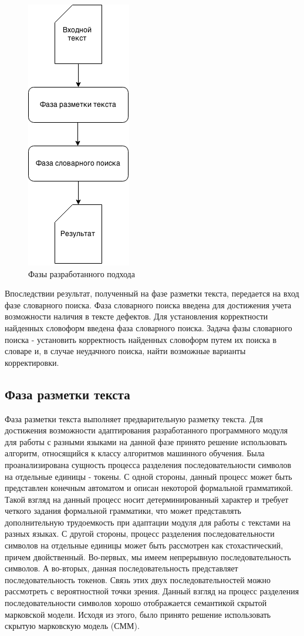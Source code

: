 \begin{figure}[H]
	\centering
	\includegraphics[scale=0.7]{img/approach.png}
	\caption{Фазы разработанного подхода}
\end{figure}
Впоследствии результат, полученный на фазе разметки текста, передается на вход фазе словарного поиска. Фаза словарного поиска введена для достижения учета возможности наличия в тексте дефектов. Для установления корректности найденных словоформ введена фаза словарного поиска. Задача фазы словарного поиска - установить корректность найденных словоформ путем их поиска в словаре и, в случае неудачного поиска, найти возможные варианты корректировки.

\subsection{Фаза разметки текста}
Фаза разметки текста выполняет предварительную разметку текста. Для достижения возможности адаптирования разработанного программного модуля для работы с разными языками на данной фазе принято решение использовать алгоритм, относящийся к классу алгоритмов машинного обучения. Была проанализирована сущность процесса разделения последовательности символов на отдельные единицы - токены. С одной стороны, данный процесс может быть представлен конечным автоматом и описан некоторой формальной грамматикой. Такой взгляд на данный процесс носит детерминированный характер и требует четкого задания формальной грамматики, что может представлять дополнительную трудоемкость при адаптации модуля для работы с текстами на разных языках. С другой стороны, процесс разделения последовательности символов на отдельные единицы может быть рассмотрен как стохастический, причем двойственный. Во-первых, мы имеем непрерывную последовательность символов. А во-вторых, данная последовательность представляет последовательность токенов. Связь этих двух последовательностей можно рассмотреть с вероятностной точки зрения. Данный взгляд на процесс разделения последовательности символов хорошо отображается семантикой скрытой марковской модели. Исходя из этого, было принято решение использовать скрытую марковскую модель (СММ). 

